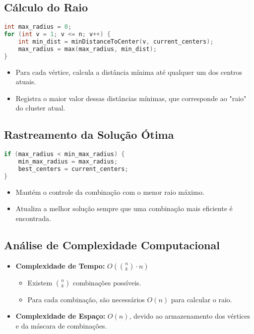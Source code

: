 \documentclass[10pt,conference]{IEEEtran}
\begin{document}
\subsection{Cálculo do Raio}
\begin{lstlisting}[language=C++, caption=Código para Cálculo do Raio]
int max_radius = 0;
for (int v = 1; v <= n; v++) {
    int min_dist = minDistanceToCenter(v, current_centers);
    max_radius = max(max_radius, min_dist);
}
\end{lstlisting}
\begin{itemize}
    \item Para cada vértice, calcula a distância mínima até qualquer um dos centros atuais.
    \item Registra o maior valor dessas distâncias mínimas, que corresponde ao "raio" do cluster atual.
\end{itemize}

\subsection{Rastreamento da Solução Ótima}
\begin{lstlisting}[language=C++, caption=Código para Rastreamento da Melhor Solução]
if (max_radius < min_max_radius) {
    min_max_radius = max_radius;
    best_centers = current_centers;
}
\end{lstlisting}
\begin{itemize}
    \item Mantém o controle da combinação com o menor raio máximo.
    \item Atualiza a melhor solução sempre que uma combinação mais eficiente é encontrada.
\end{itemize}

\subsection{Análise de Complexidade Computacional}
\begin{itemize}
    \item \textbf{Complexidade de Tempo:} \(O(\binom{n}{k} \cdot n)\)
        \begin{itemize}
            \item Existem \(\binom{n}{k}\) combinações possíveis.
            \item Para cada combinação, são necessários \(O(n)\) para calcular o raio.
        \end{itemize}
    \item \textbf{Complexidade de Espaço:} \(O(n)\), devido ao armazenamento dos vértices e da máscara de combinações.
\end{itemize}
\end{document}
